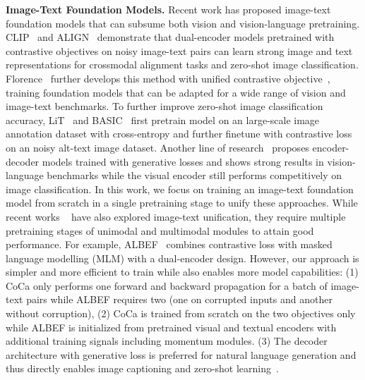 \textbf{Image-Text Foundation Models.}
Recent work has proposed image-text foundation models that can subsume both vision and vision-language pretraining.
CLIP~\cite{radford2021learning} and ALIGN~\cite{jia2021scaling} demonstrate that dual-encoder models pretrained with contrastive objectives on noisy image-text pairs 
can learn strong image and text representations for crossmodal alignment tasks and zero-shot image classification.
Florence~\cite{yuan2021florence} further develops this method with unified contrastive objective~\cite{yang2022unified}, training foundation models that can be adapted for a wide range of vision and image-text benchmarks. To further improve zero-shot image classification accuracy, LiT~\cite{zhai2021lit} and BASIC~\cite{pham2021combined} first pretrain model on an large-scale image annotation dataset with cross-entropy and further finetune with contrastive loss on an noisy alt-text image dataset.
Another line of research~\cite{wang2021simvlm, wang2022unifying, piergiovanni2022answer} proposes encoder-decoder models trained with generative losses and shows strong results in vision-language benchmarks while the visual encoder still performs competitively on image classification. 
In this work, we focus on training an image-text foundation model from scratch in a single pretraining stage to unify these approaches.
While recent works ~\cite{singh2021flava,li2021align,li2022blip} have also explored image-text unification,
they require multiple pretraining stages of unimodal and multimodal modules to attain good performance.
For example, ALBEF~\cite{li2021align} combines contrastive loss with masked language modelling (MLM) with a dual-encoder design. 
However, our approach is simpler and more efficient to train while also enables more model capabilities:
(1) CoCa only performs one forward and backward propagation for a batch of image-text pairs while ALBEF requires two (one on corrupted inputs and another without corruption),
(2) CoCa is trained from scratch on the two objectives only while ALBEF is initialized from pretrained visual and textual encoders with additional training signals including momentum modules.
(3) The decoder architecture with generative loss is preferred for natural language generation and thus directly enables image captioning and zero-shot learning~\cite{wang2021simvlm}.